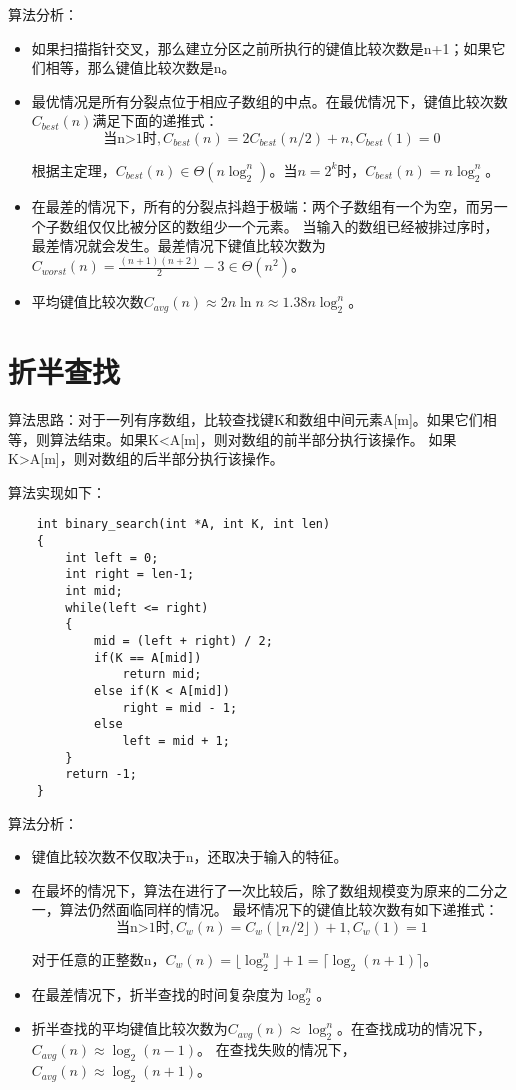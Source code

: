 \documentclass[a4paper,left=2.5cm,right=2.5cm,11pt]{article}
\begin{document}
	算法分析：
	\begin{itemize}
		\item 如果扫描指针交叉，那么建立分区之前所执行的键值比较次数是n+1；如果它们相等，那么键值比较次数是n。
		\item 最优情况是所有分裂点位于相应子数组的中点。在最优情况下，键值比较次数$C_{best}(n)$满足下面的递推式：
		\begin{equation}
			\text{当n>1时},C_{best}(n) = 2C_{best}(n/2)+n,C_{best}(1)=0
		\end{equation}

		根据主定理，$C_{best}(n) \in \Theta(n\log_2^n)$。当$n=2^k$时，$C_{best}(n)=n\log_2^n$。
		\item 在最差的情况下，所有的分裂点抖趋于极端：两个子数组有一个为空，而另一个子数组仅仅比被分区的数组少一个元素。
		当输入的数组已经被排过序时，最差情况就会发生。最差情况下键值比较次数为$C_{worst}(n)=\frac{(n+1)(n+2)}{2}-3 \in \Theta(n^2)$。
		\item 平均键值比较次数$C_{avg}(n) \approx 2n\ln{n} \approx 1.38n\log_2^n$。
	\end{itemize}

\section{折半查找}
	算法思路：对于一列有序数组，比较查找键K和数组中间元素A[m]。如果它们相等，则算法结束。如果K<A[m]，则对数组的前半部分执行该操作。
	如果K>A[m]，则对数组的后半部分执行该操作。\par
	算法实现如下：
	\begin{lstlisting}
	int binary_search(int *A, int K, int len)
	{
		int left = 0;
		int right = len-1;
		int mid;
		while(left <= right)
		{
			mid = (left + right) / 2;
			if(K == A[mid])
				return mid;
			else if(K < A[mid])
				right = mid - 1;
			else
				left = mid + 1;
		}
		return -1;
	}
	\end{lstlisting}

	算法分析：
	\begin{itemize}
		\item 键值比较次数不仅取决于n，还取决于输入的特征。
		\item  
		在最坏的情况下，算法在进行了一次比较后，除了数组规模变为原来的二分之一，算法仍然面临同样的情况。
		最坏情况下的键值比较次数有如下递推式：
		\begin{equation}
			\text{当n>1时}, C_w(n) = C_w(\lfloor n/2 \rfloor) + 1, C_w(1) = 1
		\end{equation}

		对于任意的正整数n，$C_w(n) = \lfloor \log_2^n \rfloor + 1 = \lceil \log_2(n+1) \rceil$。
		\item 在最差情况下，折半查找的时间复杂度为$\log_2^n$。
		\item 折半查找的平均键值比较次数为$C_{avg}(n) \approx \log_2^n$。在查找成功的情况下，$C_{avg}(n) \approx \log_2(n-1)$。
		在查找失败的情况下，$C_{avg}(n) \approx \log_2(n+1)$。
	\end{itemize}
\end{document}
